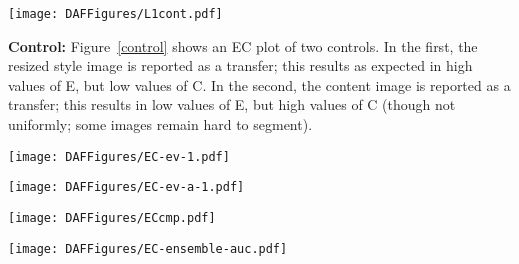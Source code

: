 \documentclass[runningheads]{llncs}
\begin{document}
\begin{figure*}[!htbp]
    \texttt{[image: DAFFigures/L1cont.pdf]}
\caption{An EC plot comparing two control methods.  One reports the resized style image as the transfer (small diamonds,
  yellow curve) and the other reports the content image as the transfer (large dots, blue curve).  Colors are keyed to
  style.  There is significant variance in E for the resized style image, an effect due to resizing.  However, the range
  of E's shows the size of the effect of resizing on E; on average, E slightly greater than 4, only slightly larger
than that achieved by the cross-layer loss. The curves are Loess regression curves of E against C, with shadowed regions showing one
  standard error bars up and down. Scale is the same as Figure \protect \ref{ecxvg}.   }
\label{control}
\end{figure*}
{\bf Control:}  Figure~\ref{control} shows an EC plot of two controls.  In the first, the resized style image is reported as a
transfer; this results as expected in high values of E, but low values of C.  In the second, the content image is
reported as a transfer; this results in low values of E, but high values of C (though not uniformly; some images remain
hard to segment).  

\begin{figure*}
  \texttt{[image: DAFFigures/EC-ev-1.pdf]}
  \caption{An EC plot  comparing different style transfer methods with midrange weights on the first convolutional layer of VGG16. Here C is the largest Eigenvalues. EC plot for the rest of 4 layers are shown in supplementary materials}
\end{figure*}


\begin{figure*}
  \texttt{[image: DAFFigures/EC-ev-a-1.pdf]}
  \caption{An EC plot  comparing different style transfer methods with aggressive weights on the first convolutional layer of VGG16. Here C is the largest Eigenvalues. EC plot for the rest of 4 layers are shown in supplementary materials}
\end{figure*}

\begin{figure*}
  \texttt{[image: DAFFigures/ECcmp.pdf]}
  \caption{An EC plot  comparing different style transfer methods. Here C is boundary AUC)}
\end{figure*}


\begin{figure*}
  \texttt{[image: DAFFigures/EC-ensemble-auc.pdf]}
  \caption{comparing cross-layer additive (the best) to something that chooses best E result
from all four (xa, xm, g, f) and something that chooses best Q (ExC) from result.}
\end{figure*}
\end{document}
